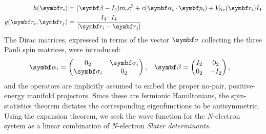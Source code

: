 \begin{subequations}
 \begin{align}
   h(\vect{r}_i) &= (\mat{\beta} - I_4)\si{\electronmass}c^2 +
   c(\mat{\alpha}_i\cdot\vect{p}_i) + V_{\mathrm{Ne}}(\vect{r}_i)I_4 \\
   g(\vect{r}_i, \vect{r}_j) &= \frac{I_4\cdot I_4}{|\vect{r}_i - \vect{r}_j|}
   \label{eq:g-r-coulomb}
 \end{align}
\end{subequations}
The Dirac matrices, expressed in terms of the vector $\mat{\sigma}$
collecting the three Pauli spin matrices, were introduced:
\begin{alignat}{2}
  \mat{\alpha}_i =
  \begin{pmatrix}
    0_2 & \mat{\sigma}_i \\
    \mat{\sigma}_i & 0_2
  \end{pmatrix},
  \quad&
  \mat{\beta} =
  \begin{pmatrix}
    I_2 & 0_2 \\
    0_2 & -I_2
  \end{pmatrix},
\end{alignat}
and the operators are implicitly assumed to embed the proper no-pair,
positive-energy manifold projectors.\autocite{Sucher1980-vf}
Since these are fermionic Hamiltonians, the spin-statistics theorem
dictates the corresponding eigenfunctions to be
antisymmetric.
Using the expansion theorem,\autocite{Gross1991-hi} we seek the wave
function for the $N$-electron system as a linear combination of
$N$-electron \emph{Slater determinants}.

